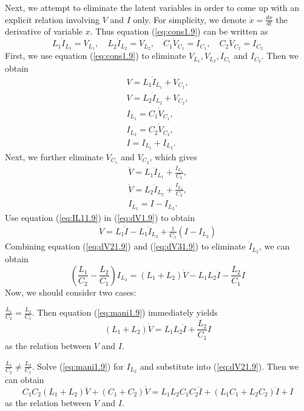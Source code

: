 Next, we attempt to eliminate the latent variables in order to come up with an explicit relation involving $V$ and $I$ only. For simplicity, we denote $\dot{x} = \frac{dx}{dt}$ the derivative of variable $x$. Thus equation (\ref{eq:cons1.9}) can be written as
\begin{equation}
    L_1\dot{I}_{L_1} = V_{L_1}, \quad
    L_2\dot{I}_{L_2} = V_{L_2}, \quad
    C_1\dot{V}_{C_1} = I_{C_1}, \quad
    C_2\dot{V}_{C_2} = I_{C_2} 
\end{equation}
First, we use equation (\ref{eq:cons1.9}) to eliminate $V_{L_1},V_{L_2},I_{C_1}$ and $I_{C_2}$. Then we obtain
\begin{align}
    V = L_1\dot{I}_{L_1} + V_{C_1}, \\
    V = L_2\dot{I}_{L_2} + V_{C_2}, \\
    I_{L_1} = C_1\dot{V}_{C_1},     \\
    I_{L_2} = C_2\dot{V}_{C_2},     \\
    I = I_{L_1} + I_{L_2}.
\end{align}
Next, we further eliminate $V_{C_1}$ and $V_{C_2}$, which gives
\begin{align}
    \dot{V} = L_1\ddot{I}_{L_1} + \frac{I_{L_1}}{C_1},\label{eq:dV1.9}  \\
    \dot{V} = L_2\ddot{I}_{L_2} + \frac{I_{L_2}}{C_2},\label{eq:dV21.9}  \\
    I_{L_1} = I - I_{L_2}.\label{eq:IL11.9}
\end{align}
Use equation (\ref{eq:IL11.9}) in (\ref{eq:dV1.9}) to obtain
\begin{eqnarray}\label{eq:dV31.9}
    \dot{V} = L_1\ddot{I} - L_1\ddot{I}_{L_2} + \frac{1}{C_1}(I-I_{L_2})
\end{eqnarray}
Combining equation (\ref{eq:dV21.9}) and (\ref{eq:dV31.9}) to eliminate $\ddot{I}_{L_2}$, we can obtain
\begin{equation}\label{eq:mani1.9}
    (\frac{L_1}{C_2} - \frac{L_2}{C_1})I_{L_2} = (L_1+L_2)\dot{V} - L_1L_2\ddot{I} - \frac{L_2}{C_1}I
\end{equation}
Now, we should consider two cases:

 $\frac{L_1}{C_2} = \frac{L_2}{C_1}$. Then equation (\ref{eq:mani1.9}) immediately yields
\begin{equation}\label{eq:case11.9}
    (L_1+L_2)\dot{V} = L_1L_2\ddot{I} + \frac{L_2}{C_1}I
\end{equation}
as the relation between $V$ and $I$.

 $\frac{L_1}{C_2} \neq \frac{L_2}{C_1}$. Solve (\ref{eq:mani1.9}) for $I_{L_2}$ and substitute into (\ref{eq:dV21.9}). Then we can obtain
\begin{equation}\label{eq:case21.9}
    C_1C_2(L_1+L_2)\dddot{V} + (C_1+C_2)\dot{V} = L_1L_2C_1C_2\ddddot{I} + (L_1C_1+L_2C_2)\ddot{I} + I
\end{equation}
as the relation between $V$ and $I$.

